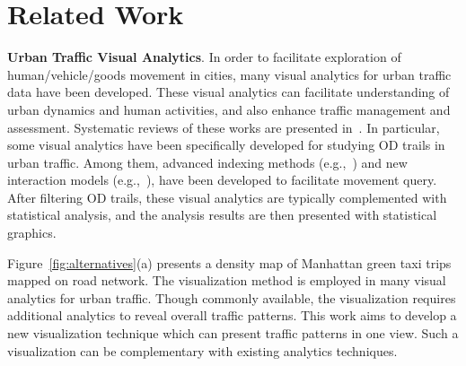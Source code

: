 \section{Related Work}
\label{sec:related}

\noindent
\textbf{Urban Traffic Visual Analytics}.
In order to facilitate exploration of human/vehicle/goods movement in cities, many visual analytics for urban traffic data have been developed.
These visual analytics can facilitate understanding of urban dynamics and human activities, and also enhance traffic management and assessment.
Systematic reviews of these works are presented in~\cite{chen_survey_2015, andrienko2017visual}.
In particular, some visual analytics have been specifically developed for studying OD trails in urban traffic.
Among them, advanced indexing methods (e.g.,~\cite{ferreira2013visual, zeng_2015_visualizing}) and new interaction models (e.g.,~\cite{kruger_trajectorylenses_2013, zeng_2015_visualizing}), have been developed to facilitate movement query.
After filtering OD trails, these visual analytics are typically complemented with statistical analysis, and the analysis results are then presented with statistical graphics.

Figure~\ref{fig:alternatives}(a) presents a density map of Manhattan green taxi trips mapped on road network.
The visualization method is employed in many visual analytics for urban traffic.
Though commonly available, the visualization requires additional analytics to reveal overall traffic patterns.
This work aims to develop a new visualization technique which can present traffic patterns in one view.
Such a visualization can be complementary with existing analytics techniques.

